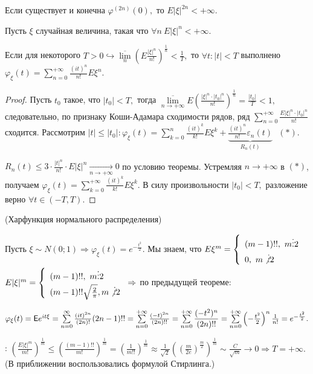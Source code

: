 	\begin{property}[б/д]
		Если существует и конечна $\varphi^{(2n)}(0),$ то $E|\xi|^{2n} < +\infty.$
	\end{property}
	\begin{theorem}
		Пусть $\xi$ случайная величина, такая что $\forall n \  E|\xi|^n < +\infty$. 
		
		Если для некоторого $T > 0 \hookrightarrow \overline{\lim\limits_{n}}\left(E \frac{|\xi|^n}{n!}\right)^\frac{1}{n} < \frac{1}{T},$ то $\forall t: |t| < T$ выполнено $\varphi_\xi(t) = \sum\limits_{n = 0}^{+\infty} \frac{(it)^n}{n!}E\xi^n.$
		\begin{proof}
			Пусть $t_0$ такое, что $|t_0| < T, $ тогда $\overline{\lim\limits_{n \to +\infty}}E\left(\frac{|\xi|^n \cdot |t_0|^n}{n!}\right)^{\frac{1}{n}} = \frac{|t_0|}{T} < 1, $ следовательно, по признаку Коши-Адамара сходимости рядов, ряд $\sum\limits_{n = 0}^{+\infty} \frac{E|\xi|^n\cdot|t_0|^n}{n!}$ сходится.
			Рассмотрим $|t| \leqslant |t_0|: \varphi_\xi(t) = \sum\limits_{k = 0}^{n} \frac{(it)^k}{k!}E\xi^k + \underbrace{\frac{(it)^n}{n!}\varepsilon_n(t)}_{R_n(t)}~~~(*).$ 

			\noindent$R_n(t) \leqslant 3\cdot \frac{|t|^n}{n!}\cdot E|\xi|^n \underset{n \to +\infty}{\longrightarrow} 0$ по условию теоремы. Устремляя $n\to + \infty$ в $(*)$, получаем $\varphi_\xi(t) = \sum\limits_{k = 0}^{+\infty} \frac{(it)^k}{k!}E\xi^k.$ В силу произвольности $|t_0| < T,$ разложение верно $\forall t \in (-T, T).$
		\end{proof}
	\end{theorem}

	\begin{example} (Харфункция нормального распределения)
	
		Пусть $\xi \sim N(0;1) \Rightarrow \varphi_\xi(t) = e^{- \frac{t^2}{2}}.$ Мы знаем, что $E\xi^m = \left\{
			\begin{array}{l}
			(m-1)!!, ~m \vdots 2\\
			0, ~m\not \vdots 2
			\end{array}
		\right.$
		$E|\xi|^m = \left\{
			\begin{array}{l}
			(m - 1)!!, ~m \vdots 2\\
			(m - 1)!!\sqrt{\frac{2}{\pi}}, m \not \vdots 2
			\end{array}
		\right. \Rightarrow$ по предыдущей теореме:
		
		$\varphi_\xi(t) = \mathsf{E} e^{it\xi} = \sum\limits_{n = 0}^{\infty} \frac{(it)^{2n}}{(2n)!}(2n - 1)!! = \sum\limits_{n = 0}^{+\infty} \frac{(-t)^{2n}}{(2n)!!} = \sum\limits_{n = 0}^{+\infty} \dfrac{(- t^2)^n}{(2n)!!} = \sum\limits_{n = 0}^{+\infty} \left(- \frac{t^2}{2}\right)^n \frac{1}{n!} = e^{-\frac{t^2}{2}}.$

		\underline{}: $\left(\frac{E|\xi|^m}{m!}\right)^{\frac{1}{m}} \leqslant \left(\frac{(m - 1)!!}{m!}\right)^{\frac{1}{m}} = \left(\frac{1}{m!!}\right)^{\frac{1}{m}} \approx \frac{1}{\sqrt{2}}\left(\left(\frac{m}{2e}\right)^{\frac{m}{2}}\right)^{\frac{1}{m}} \sim \frac{C}{\sqrt{m}} \to 0 \Rightarrow T = + \infty.$ (В приближении воспользовались формулой Стирлинга.)
	\end{example}

